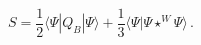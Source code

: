 \begin{equation}
S={\frac{1}{2}}\langle \Psi |Q_{B}|\Psi \rangle +{\frac{1}{3}}\langle \Psi
|\Psi \star ^{W}\Psi \rangle\, .  \label{eq:Witten's action}
\end{equation}


